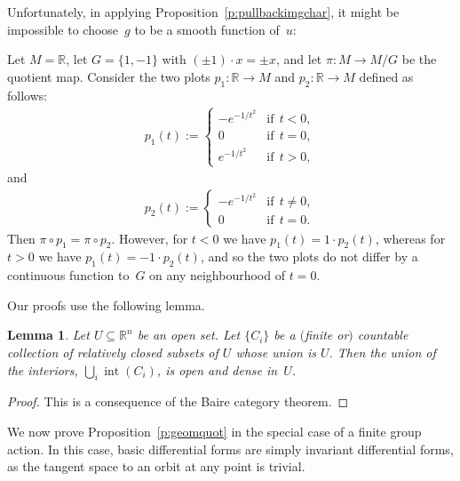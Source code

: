 \documentclass[pdftex]{sigma}
\numberwithin{equation}{section}
\newtheorem{Lemma}[Theorem]{Lemma}
\newcommand{\RR}{{\mathbb{R}}} %
\newcommand{\ZZ}{{\mathbb{Z}}} %
\newcommand{\inter}{{\operatorname{int}}} %
\newcommand{\hypref}[2]{{#2~\ref{#1}}}
\begin{document}
Unfortunately, in applying \hypref{p:pullbackimgchar}{Proposition},
it might be impossible to choose~$g$
to be a smooth function of~$u$:

\begin{Example}[$\ZZ_2\circlearrowright\RR$]
\label{x:plots differ nonsmoothly}
Let $M=\RR$, let $G = \{ 1, -1 \}$ with $(\pm1) \cdot x = \pm x$,
and let $\pi \colon M \to M/G$ be the quotient map.
Consider the two plots
$p_1 \colon \RR\to M$ and $p_2 \colon \RR\to M$
def\/ined as follows:
\begin{gather*} p_1(t) := \begin{cases} -e^{-1/t^2}  & \text{if} \ \ t<0, \\
 0  & \text{if} \ \ t=0, \\
 e^{-1/t^2}  & \text{if} \ \ t>0,
\end{cases}\end{gather*}
and
\begin{gather*} p_2(t):= \begin{cases} -e^{-1/t^2}  & \text{if} \ \ t\neq 0, \\
 0  & \text{if} \ \ t=0.
\end{cases}\end{gather*}
Then $\pi \circ p_1 = \pi \circ p_2$.
However, for $t<0$ we have $p_1(t)=1\cdot p_2(t)$,
whereas for $t>0$ we have $p_1(t)=-1\cdot p_2(t)$,
and so the two plots
do not dif\/fer by a continuous function to~$G$
on any neighbourhood of $t=0$.
\end{Example}

Our proofs use the following lemma.

\begin{Lemma}\label{l:baire}
Let $U \subseteq \RR^n$ be an open set.
Let $\{ C_i \}$ be a $($finite or$)$ countable collection
of relatively closed subsets of $U$ whose union is $U$.
Then the union of the interiors, $\bigcup_i \inter(C_i)$,
is open and dense in~$U$.
\end{Lemma}

\begin{proof}
This is a consequence of the Baire category theorem.
\end{proof}


We now prove Proposition~\ref{p:geomquot} in the special case of a f\/inite group action. In this case, basic dif\/ferential forms are simply invariant dif\/ferential forms, as the tangent space to an orbit at any point is trivial.
\end{document}
